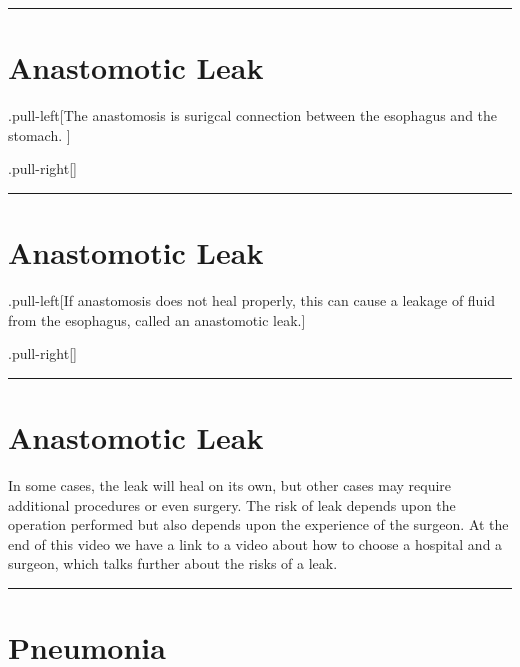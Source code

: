 \documentclass[
]{article}
\begin{document}
\begin{center}\rule{0.5\linewidth}{0.5pt}\end{center}

\hypertarget{anastomotic-leak}{%
\section{Anastomotic Leak}\label{anastomotic-leak}}

.pull-left{[}The anastomosis is surigcal connection between the
esophagus and the stomach. {]}

.pull-right{[}{]}

\begin{center}\rule{0.5\linewidth}{0.5pt}\end{center}

\hypertarget{anastomotic-leak-1}{%
\section{Anastomotic Leak}\label{anastomotic-leak-1}}

.pull-left{[}If anastomosis does not heal properly, this can cause a
leakage of fluid from the esophagus, called an anastomotic leak.{]}

.pull-right{[}{]}

\begin{center}\rule{0.5\linewidth}{0.5pt}\end{center}

\hypertarget{anastomotic-leak-2}{%
\section{Anastomotic Leak}\label{anastomotic-leak-2}}

In some cases, the leak will heal on its own, but other cases may
require additional procedures or even surgery. The risk of leak depends
upon the operation performed but also depends upon the experience of the
surgeon. At the end of this video we have a link to a video about how to
choose a hospital and a surgeon, which talks further about the risks of
a leak.

\begin{center}\rule{0.5\linewidth}{0.5pt}\end{center}

\hypertarget{pneumonia}{%
\section{Pneumonia}\label{pneumonia}}
\end{document}
